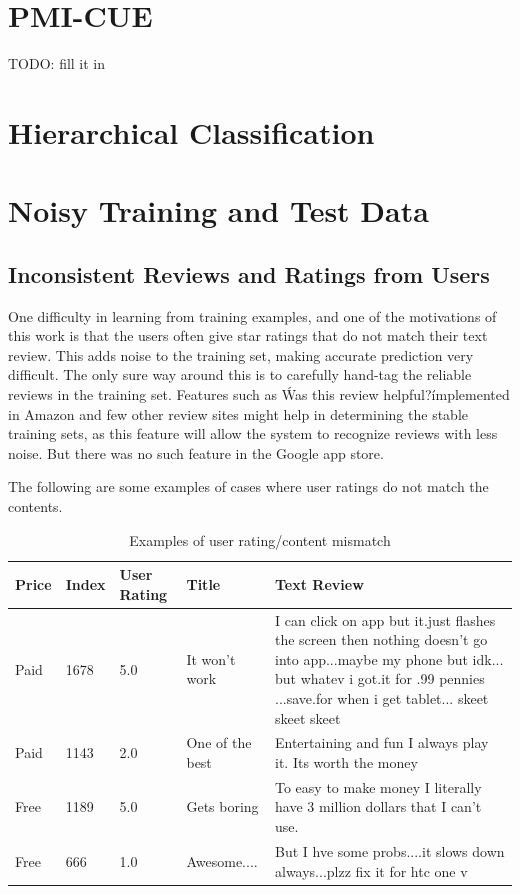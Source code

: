\documentclass[11pt]{report} %
\begin{document}
	\section{PMI-CUE}

TODO: fill it in

	\section{Hierarchical Classification}

	\section{Noisy Training and Test Data}
\subsection{Inconsistent Reviews and Ratings from Users}

One difficulty in learning from training examples, and one of the motivations of this work is that the users often give star ratings that do not match their text review. This adds noise to the training set, making accurate prediction very difficult. The only sure way around this is to carefully hand-tag the reliable reviews in the training set. Features such as \'Was this review helpful?\' implemented in Amazon and few other review sites might help in determining the stable training sets, as this feature will allow the system to recognize reviews with less noise. But there was no such feature in the Google app store.

The following are some examples of cases where user ratings do not match the contents.

\begin{table}[h]
	\centering
    \begin{tabularx}{\textwidth}{ l | l | l |  l | X}
    \hline\hline
		Price  & Index & User Rating & Title & Text Review\\ 
    \hline
		Paid & 1678 & 5.0 & It won't work & I can click on app but it.just flashes the screen then nothing doesn't go into app...maybe my phone but idk... but whatev i got.it for .99 pennies ...save.for when i get tablet... skeet skeet skeet \\
		Paid & 1143 & 2.0 & One of the best & Entertaining and fun I always play it. Its worth the money \\
		Free & 1189 & 5.0 & Gets boring & To easy to make money I literally have 3 million dollars that I can't use. \\
		Free & 666 & 1.0 & Awesome.... & But I hve some probs....it slows down always...plzz fix it for htc one v \\
    \hline
    \end{tabularx}
\caption{Examples of user rating/content mismatch}
\label{fig:postags}
\end{table}
\end{document}
